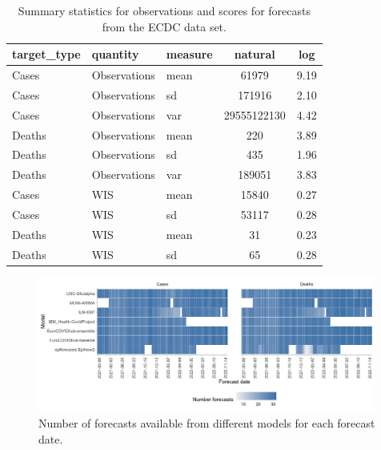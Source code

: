 \documentclass{article}
\begin{document}




\begin{table}[h!]
    \centering
\begin{tabular}{lllcc}
\toprule
target\_type & quantity & measure & natural & log\\
\midrule
Cases & Observations & mean & 61979 & 9.19\\
Cases & Observations & sd & 171916 & 2.10\\
Cases & Observations & var & 29555122130 & 4.42\\
Deaths & Observations & mean & 220 & 3.89\\
Deaths & Observations & sd & 435 & 1.96\\
\addlinespace
Deaths & Observations & var & 189051 & 3.83\\
Cases & WIS & mean & 15840 & 0.27\\
Cases & WIS & sd & 53117 & 0.28\\
Deaths & WIS & mean & 31 & 0.23\\
Deaths & WIS & sd & 65 & 0.28\\
\bottomrule
\end{tabular}
    \caption{Summary statistics for observations and scores for forecasts from the ECDC data set.}
    \label{tab:HUB-summary}
\end{table}

\begin{figure}[h!]
    \centering
    \includegraphics[width=0.99\textwidth]{output/figures/number-avail-forecasts.png}
    \caption{
    Number of forecasts available from different models for each forecast date. 
    }
    \label{fig:HUB-num-avail-models}
\end{figure}
\end{document}
